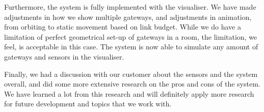\documentclass[../document]{subfiles}
\begin{document}
Furthermore, the system is fully implemented with the visualiser. We have made adjustments in how we show multiple gateways, and adjustments in animation, from orbiting to static movement based on link budget. While we do have a limitation of perfect geometrical set-up of gateways in a room, the limitation, we feel, is acceptable in this case. The system is now able to simulate any amount of gateways and sensors in the visualiser.

Finally, we had a discussion with our customer about the sensors and the system overall, and did some more extensive research on the pros and cons of the system. We have learned a lot from this research and will definitely apply more research for future development and topics that we work with. 
\end{document}
